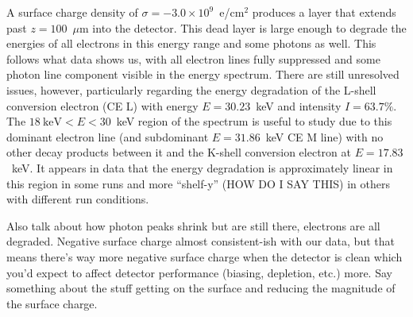 \documentclass[nofootinbib,superscriptaddress, aps, prc, 
10pt, amsmath, amssymb, bibnotes,
altaffilletter, twocolumn, floatfix]{revtex4-2}
\begin{document}
        

        A surface charge density of $\sigma = -3.0 \times 10^9$~e/cm$^2$ produces a layer that extends past $z = 100$~$\mu$m into the detector. This dead layer is large enough to degrade the energies of all electrons in this energy range and some photons as well. This follows what data shows us, with all electron lines fully suppressed and some photon line component visible in the energy spectrum. There are still unresolved issues, however, particularly regarding the energy degradation of the L-shell conversion electron (CE L) with energy $E = 30.23$~keV and intensity $I = 63.7\%$. The $18~\mathrm{keV} < E < 30$~keV region of the spectrum is useful to study due to this dominant electron line (and subdominant $E = 31.86$~keV CE M line) with no other decay products between it and the K-shell conversion electron at $E = 17.83$~keV. It appears in data that the energy degradation is approximately linear in this region in some runs and more ``shelf-y'' (HOW DO I SAY THIS) in others with different run conditions. 

        Also talk about how photon peaks shrink but are still there, electrons are all degraded. Negative surface charge almost consistent-ish with our data, but that means there's way more negative surface charge when the detector is clean which you'd expect to affect detector performance (biasing, depletion, etc.) more. Say something about the stuff getting on the surface and reducing the magnitude of the surface charge. 
\end{document}
